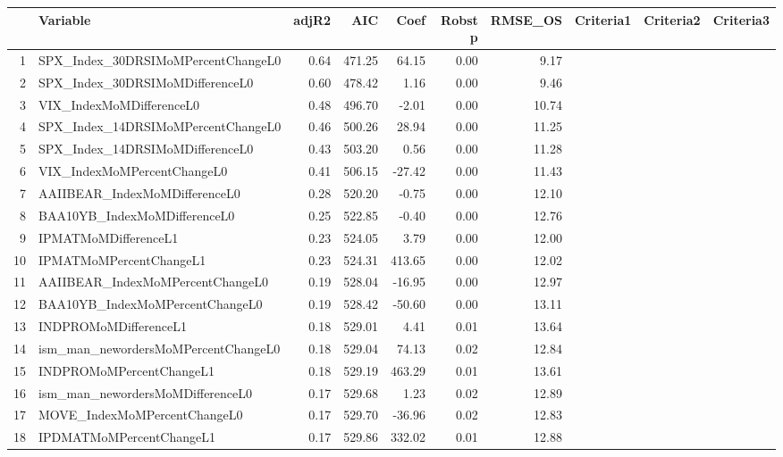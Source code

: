 \begin{longtable}{rlrrrrrlll}
  \hline
 & Variable & adjR2 & AIC & Coef & Robst p & RMSE\_OS & Criteria1 & Criteria2 & Criteria3 \\ 
  \hline
1 & SPX\_Index\_30DRSIMoMPercentChangeL0 & 0.64 & 471.25 & 64.15 & 0.00 & 9.17 &  &  &  \\ 
  2 & SPX\_Index\_30DRSIMoMDifferenceL0 & 0.60 & 478.42 & 1.16 & 0.00 & 9.46 &  &  &  \\ 
  3 & VIX\_IndexMoMDifferenceL0 & 0.48 & 496.70 & -2.01 & 0.00 & 10.74 &  &  &  \\ 
  4 & SPX\_Index\_14DRSIMoMPercentChangeL0 & 0.46 & 500.26 & 28.94 & 0.00 & 11.25 &  &  &  \\ 
  5 & SPX\_Index\_14DRSIMoMDifferenceL0 & 0.43 & 503.20 & 0.56 & 0.00 & 11.28 &  &  &  \\ 
  6 & VIX\_IndexMoMPercentChangeL0 & 0.41 & 506.15 & -27.42 & 0.00 & 11.43 &  &  &  \\ 
  7 & AAIIBEAR\_IndexMoMDifferenceL0 & 0.28 & 520.20 & -0.75 & 0.00 & 12.10 &  &  &  \\ 
  8 & BAA10YB\_IndexMoMDifferenceL0 & 0.25 & 522.85 & -0.40 & 0.00 & 12.76 &  &  &  \\ 
  9 & IPMATMoMDifferenceL1 & 0.23 & 524.05 & 3.79 & 0.00 & 12.00 &  &  &  \\ 
  10 & IPMATMoMPercentChangeL1 & 0.23 & 524.31 & 413.65 & 0.00 & 12.02 &  &  &  \\ 
  11 & AAIIBEAR\_IndexMoMPercentChangeL0 & 0.19 & 528.04 & -16.95 & 0.00 & 12.97 &  &  &  \\ 
  12 & BAA10YB\_IndexMoMPercentChangeL0 & 0.19 & 528.42 & -50.60 & 0.00 & 13.11 &  &  &  \\ 
  13 & INDPROMoMDifferenceL1 & 0.18 & 529.01 & 4.41 & 0.01 & 13.64 &  &  &  \\ 
  14 & ism\_man\_newordersMoMPercentChangeL0 & 0.18 & 529.04 & 74.13 & 0.02 & 12.84 &  &  &  \\ 
  15 & INDPROMoMPercentChangeL1 & 0.18 & 529.19 & 463.29 & 0.01 & 13.61 &  &  &  \\ 
  16 & ism\_man\_newordersMoMDifferenceL0 & 0.17 & 529.68 & 1.23 & 0.02 & 12.89 &  &  &  \\ 
  17 & MOVE\_IndexMoMPercentChangeL0 & 0.17 & 529.70 & -36.96 & 0.02 & 12.83 &  &  &  \\ 
  18 & IPDMATMoMPercentChangeL1 & 0.17 & 529.86 & 332.02 & 0.01 & 12.88 &  &  &  \\ 

\end{longtable}
